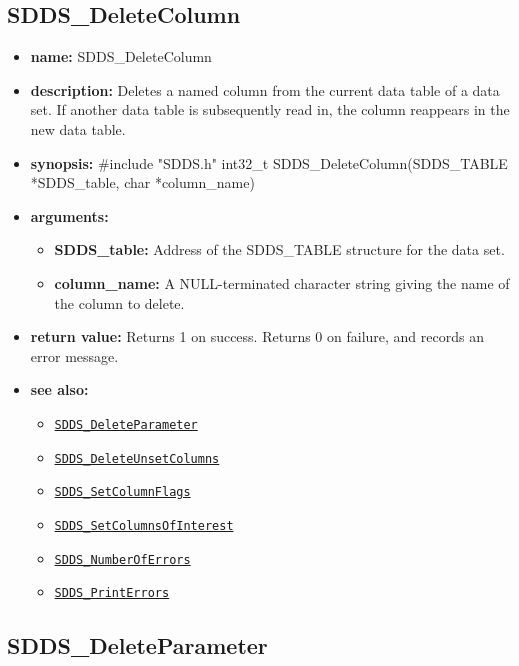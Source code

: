 \documentclass[11pt]{article}
\newcommand{\progref}[1]{\hyperref[SDDS_#1]{\tt SDDS\_#1}}
\begin{document}
\subsection{SDDS\_DeleteColumn}
\label{SDDS_DeleteColumn}

\begin{itemize}
\item {\bf name:}\newline
SDDS\_DeleteColumn
\item {\bf description:}\newline
Deletes a named column from the current data table of a data set. If another data table is subsequently read in, the column reappears in the new data table.
\item {\bf synopsis:} \#include "SDDS.h"\newline
int32\_t SDDS\_DeleteColumn(SDDS\_TABLE *SDDS\_table, char *column\_name)
\item {\bf arguments:}
\begin{itemize}
\item {\bf SDDS\_table:} Address of the SDDS\_TABLE structure for the data set.
\item {\bf column\_name:} A NULL-terminated character string giving the name of the column to delete.
\end{itemize}
\item {\bf return value:}\newline
Returns 1 on success. Returns 0 on failure, and records an error message.
\item {\bf see also:}
\begin{itemize}
\item \progref{DeleteParameter}
\item \progref{DeleteUnsetColumns}
\item \progref{SetColumnFlags}
\item \progref{SetColumnsOfInterest}
\item \progref{NumberOfErrors}
\item \progref{PrintErrors}
\end{itemize}
\end{itemize}

\subsection{SDDS\_DeleteParameter}
\label{SDDS_DeleteParameter}
\end{document}
